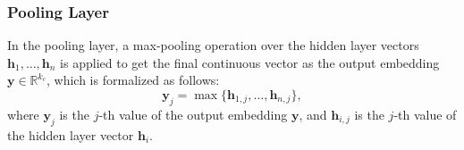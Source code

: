 \documentclass[11pt,a4paper]{article}
\begin{document}
\subsubsection{Pooling Layer}
In the pooling layer, a max-pooling operation over the hidden layer vectors ${\mathbf{h}_1, \ldots , \mathbf{h}_n}$ is applied to get the final continuous vector as the output embedding $\mathbf{y} \in \mathbb{R}^{k_c} $, which is formalized as follows:
\begin{equation}
\mathbf{y}_{j} = \max \{\mathbf{h}_{1,j}, \ldots, \mathbf{h}_{n,j} \},
\end{equation}
where $\mathbf{y}_{j}$ is the $j$-th value of the output embedding $\mathbf{y}$, and $\mathbf{h}_{i,j}$ is the $j$-th value of the hidden layer vector $\mathbf{h}_i$.




\end{document}
